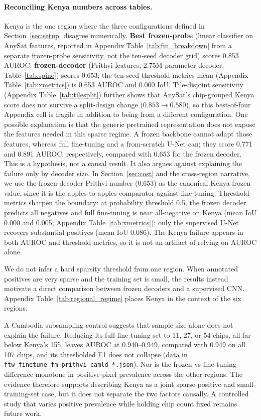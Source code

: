 \documentclass{article}
\begin{document}
\paragraph{Reconciling Kenya numbers across tables.} Kenya is the one region where
the three configurations defined in Section~\ref{sec:setup} disagree numerically.
\textbf{Best frozen-probe} (linear classifier on AnySat features, reported in
Appendix Table~\ref{tab:fm_breakdown} from a separate frozen-probe sensitivity,
not the ten-seed decoder grid) scores 0.853 AUROC;
\textbf{frozen-decoder} (Prithvi
features, 2.75M-parameter decoder, Table~\ref{tab:spine}) scores 0.653; the ten-seed threshold-metrics mean (Appendix Table~\ref{tab:xmetrics}) is 0.653 AUROC and
0.000 IoU.
Tile-disjoint sensitivity (Appendix Table~\ref{tab:tilesplit}) further shows that
AnySat's chip-grouped Kenya score does not survive a split-design change
($0.853 \to 0.580$), so this best-of-four Appendix cell is fragile in addition
to being from a different configuration. One possible explanation is that the generic
pretrained representation does not expose the features needed in this sparse regime. A
frozen backbone cannot adapt those features, whereas full fine-tuning and a from-scratch
U-Net can; they score 0.771 and 0.891 AUROC, respectively, compared with 0.653 for the
frozen decoder. This is a hypothesis, not a causal result. It also argues against
explaining the failure only by decoder size.
In Section~\ref{sec:cost} and the cross-region
narrative, we use the frozen-decoder Prithvi number (0.653) as the canonical Kenya
frozen value, since it is the apples-to-apples comparator against fine-tuning. Threshold metrics sharpen the boundary: at probability
threshold 0.5, the frozen decoder predicts all negatives and full fine-tuning is
near all-negative on Kenya (mean IoU 0.000 and 0.005; Appendix
Table~\ref{tab:xmetrics}); only the supervised U-Net recovers substantial positives
(mean IoU 0.086). The Kenya failure appears in both AUROC and threshold metrics,
so it is not an artifact of relying on AUROC alone.

We do not infer a hard sparsity threshold from one region. When annotated positives are
very sparse and the training set is small, the results instead motivate a direct comparison
between frozen decoders and a supervised CNN. Appendix Table~\ref{tab:regional_regime}
places Kenya in the context of the six regions.

A Cambodia subsampling control suggests that sample size alone does not explain the
failure. Reducing its full-fine-tuning set to 11, 27, or 54 chips, all far below Kenya's
155, leaves AUROC at
0.940--0.949, compared with 0.949 on all 107 chips, and its thresholded F1 does not
collapse (data in \texttt{ftw\_finetune\_fm\_prithvi\_camld\_*.json}). Nor is the
frozen-vs-fine-tuning difference monotone in positive-pixel prevalence across the other
regions. The evidence therefore supports describing Kenya as a joint sparse-positive and
small-training-set case, but it does not separate the two factors causally. A controlled
study that varies positive prevalence while holding chip count fixed remains future work.
\end{document}
